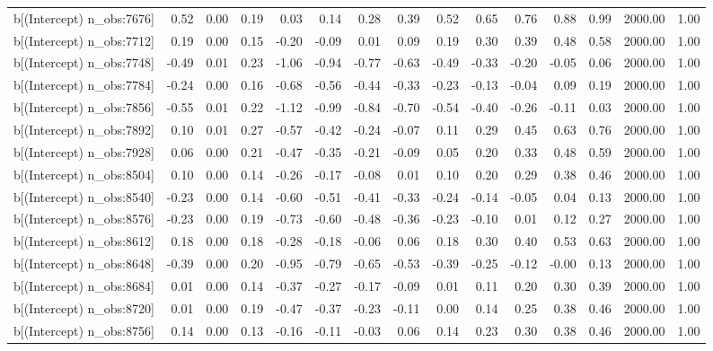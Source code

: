 \begin{table}[ht]
\begin{tabular}{rrrrrrrrrrrrrrr}
  b[(Intercept) n\_obs:7676] & 0.52 & 0.00 & 0.19 & 0.03 & 0.14 & 0.28 & 0.39 & 0.52 & 0.65 & 0.76 & 0.88 & 0.99 & 2000.00 & 1.00 \\ 
  b[(Intercept) n\_obs:7712] & 0.19 & 0.00 & 0.15 & -0.20 & -0.09 & 0.01 & 0.09 & 0.19 & 0.30 & 0.39 & 0.48 & 0.58 & 2000.00 & 1.00 \\ 
  b[(Intercept) n\_obs:7748] & -0.49 & 0.01 & 0.23 & -1.06 & -0.94 & -0.77 & -0.63 & -0.49 & -0.33 & -0.20 & -0.05 & 0.06 & 2000.00 & 1.00 \\ 
  b[(Intercept) n\_obs:7784] & -0.24 & 0.00 & 0.16 & -0.68 & -0.56 & -0.44 & -0.33 & -0.23 & -0.13 & -0.04 & 0.09 & 0.19 & 2000.00 & 1.00 \\ 
  b[(Intercept) n\_obs:7856] & -0.55 & 0.01 & 0.22 & -1.12 & -0.99 & -0.84 & -0.70 & -0.54 & -0.40 & -0.26 & -0.11 & 0.03 & 2000.00 & 1.00 \\ 
  b[(Intercept) n\_obs:7892] & 0.10 & 0.01 & 0.27 & -0.57 & -0.42 & -0.24 & -0.07 & 0.11 & 0.29 & 0.45 & 0.63 & 0.76 & 2000.00 & 1.00 \\ 
  b[(Intercept) n\_obs:7928] & 0.06 & 0.00 & 0.21 & -0.47 & -0.35 & -0.21 & -0.09 & 0.05 & 0.20 & 0.33 & 0.48 & 0.59 & 2000.00 & 1.00 \\ 
  b[(Intercept) n\_obs:8504] & 0.10 & 0.00 & 0.14 & -0.26 & -0.17 & -0.08 & 0.01 & 0.10 & 0.20 & 0.29 & 0.38 & 0.46 & 2000.00 & 1.00 \\ 
  b[(Intercept) n\_obs:8540] & -0.23 & 0.00 & 0.14 & -0.60 & -0.51 & -0.41 & -0.33 & -0.24 & -0.14 & -0.05 & 0.04 & 0.13 & 2000.00 & 1.00 \\ 
  b[(Intercept) n\_obs:8576] & -0.23 & 0.00 & 0.19 & -0.73 & -0.60 & -0.48 & -0.36 & -0.23 & -0.10 & 0.01 & 0.12 & 0.27 & 2000.00 & 1.00 \\ 
  b[(Intercept) n\_obs:8612] & 0.18 & 0.00 & 0.18 & -0.28 & -0.18 & -0.06 & 0.06 & 0.18 & 0.30 & 0.40 & 0.53 & 0.63 & 2000.00 & 1.00 \\ 
  b[(Intercept) n\_obs:8648] & -0.39 & 0.00 & 0.20 & -0.95 & -0.79 & -0.65 & -0.53 & -0.39 & -0.25 & -0.12 & -0.00 & 0.13 & 2000.00 & 1.00 \\ 
  b[(Intercept) n\_obs:8684] & 0.01 & 0.00 & 0.14 & -0.37 & -0.27 & -0.17 & -0.09 & 0.01 & 0.11 & 0.20 & 0.30 & 0.39 & 2000.00 & 1.00 \\ 
  b[(Intercept) n\_obs:8720] & 0.01 & 0.00 & 0.19 & -0.47 & -0.37 & -0.23 & -0.11 & 0.00 & 0.14 & 0.25 & 0.38 & 0.46 & 2000.00 & 1.00 \\ 
  b[(Intercept) n\_obs:8756] & 0.14 & 0.00 & 0.13 & -0.16 & -0.11 & -0.03 & 0.06 & 0.14 & 0.23 & 0.30 & 0.38 & 0.46 & 2000.00 & 1.00 \\ 

\end{tabular}
\end{table}
